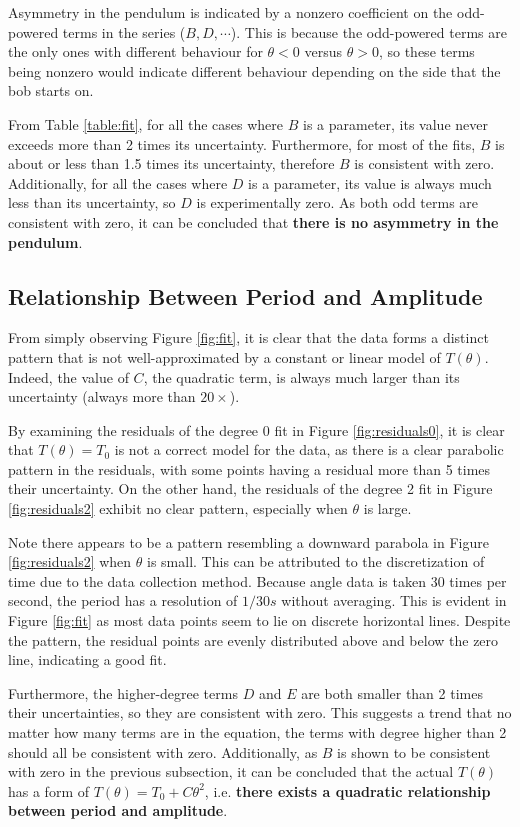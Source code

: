\documentclass[aps,twocolumn,secnumarabic,nobalancelastpage,amsmath,amssymb,nofootinbib,floatfix,letterpaper]{revtex4}
\begin{document}
Asymmetry in the pendulum is indicated by a nonzero coefficient on the odd-powered terms in the series ($B, D, \cdots$).
This is because the odd-powered terms are the only ones with different behaviour for $\theta < 0$ versus $\theta > 0$,
so these terms being nonzero would indicate different behaviour depending on the side that the bob starts on.

From Table \ref{table:fit}, for all the cases where $B$ is a parameter, its value never exceeds more than 2 times its
uncertainty. Furthermore, for most of the fits, $B$ is about or less than 1.5 times its uncertainty, therefore
\(B\) is consistent with zero. Additionally, for all the cases where $D$ is a parameter, its value is always much less
than its uncertainty, so \(D\) is experimentally zero. As both odd terms are consistent with zero, it can be
concluded that \textbf{there is no asymmetry in the pendulum}.

\subsection{Relationship Between Period and Amplitude}

From simply observing Figure \ref{fig:fit}, it is clear that the data forms a distinct pattern that is not
well-approximated by a constant or linear model of $T(\theta)$. Indeed, the value of $C$, the quadratic term, is always
much larger than its uncertainty (always more than $20 \times$).

By examining the residuals of the degree 0 fit in Figure \ref{fig:residuals0}, it is clear that \(T(\theta) = T_0\) is
not a correct model for the data, as there is a clear parabolic pattern in the residuals, with some points having a
residual more than 5 times their uncertainty. On the other hand, the residuals of the degree 2 fit in Figure
\ref{fig:residuals2} exhibit no clear pattern, especially when \(\theta\) is large.

Note there appears to be a pattern resembling a downward parabola in Figure \ref{fig:residuals2} when \(\theta\) is small.
This can be attributed to the discretization of time due to the data collection method. Because angle data is taken 30
times per second, the period has a resolution of \(1/30\si{s}\) without averaging. This is evident in Figure
\ref{fig:fit} as most data points seem to lie on discrete horizontal lines. Despite the pattern, the residual points are
evenly distributed above and below the zero line, indicating a good fit.

Furthermore, the higher-degree terms $D$ and $E$ are both smaller than 2 times their uncertainties, so they are
consistent with zero. This suggests a trend that no matter how many terms are in the equation, the terms with degree
higher than 2 should all be consistent with zero. Additionally, as $B$ is shown to be consistent with zero in the
previous subsection, it can be concluded that the actual $T(\theta)$ has a form of $T(\theta) = T_0 + C\theta^2$, i.e.
\textbf{there exists a quadratic relationship between period and amplitude}.
\end{document}
